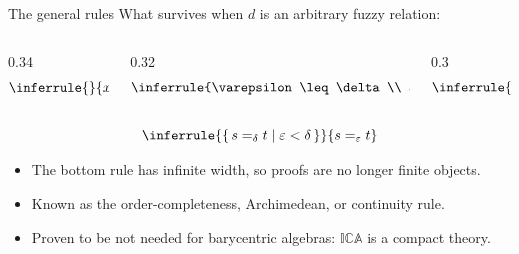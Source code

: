 \documentclass[10pt,aspectratio=169]{beamer}
\newcommand{\qeq}[1]{=_{#1}}
\newcommand{\ICA}{\mathbb{I}\mathbb{C}\mathbb{A}}
\newcommand{\eps}{\varepsilon}
\begin{document}
            \begin{frame}{The general rules}
                What survives when $d$ is an arbitrary fuzzy relation:
                \vspace{0.6em}
                \begin{columns}[c]
                    \begin{column}{0.34\textwidth}
                        \[
                            \inferrule{ }{x \qeq{d_B(x,y)} y}
                        \]
                    \end{column}
                    \begin{column}{0.32\textwidth}
                        \[
                            \inferrule{\eps \leq \delta \\ a
                            \qeq{\eps} b}{a \qeq{\delta} b}
                        \]
                    \end{column}
                    \begin{column}{0.3\textwidth}
                        \[
                            \inferrule{ }{a \qeq{1} b}
                        \]
                    \end{column}
                \end{columns}
                \vspace{1.2em}
                \[
                    \inferrule{\{\, s \qeq{\delta} t \mid \eps < \delta \,\}}
                    {s \qeq{\eps} t}
                \]
                \begin{itemize}
                    \item[--] The bottom rule has infinite
                        width, so proofs are
                        no longer finite objects.
                    \item[--] Known as the order-completeness,
                        Archimedean, or continuity rule.
                    \item[--] Proven to be not needed
                        for barycentric
                        algebras: $\ICA$ is a compact theory.
                \end{itemize}
            \end{frame}
\end{document}
